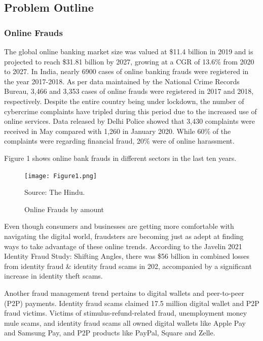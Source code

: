 \documentclass[12pt, oneside, a4paper]{article}
\begin{document}
\pagebreak
\subsection{Problem Outline}
\vspace{0.5cm}
\subsubsection{Online Frauds}
The global online banking market size was valued at \$11.4 billion in 2019 and is projected to reach \$31.81 billion by 2027, growing at a CGR of 13.6\% from 2020 to 2027. In India, nearly 6900 cases of online banking frauds were registered in the year 2017-2018. As per data maintained by the National Crime Records Bureau, 3,466 and 3,353 cases of online frauds were registered in 2017 and 2018, respectively. Despite the entire country being under lockdown, the number of cybercrime complaints have tripled during this period due to the increased use of online services. Data released by Delhi Police showed that 3,430 complaints were received in May compared with 1,260 in January 2020. While 60\% of the complaints were regarding financial fraud, 20\% were of online harassment.

Figure 1 shows online bank frauds in different sectors in the last ten years.

\begin{figure}[H]
\begin{center}
\texttt{[image: Figure1.png]}\\
\caption{Online Frauds by amount}{Source: The Hindu.}
\label{fig:Figure 1}
\end{center}
\end{figure}

Even though consumers and businesses are getting more comfortable with navigating the digital world, fraudsters are becoming just as adept at finding ways to take advantage of these online trends. According to the Javelin 2021 Identity Fraud Study: Shifting Angles, there was \$56 billion in combined losses from identity fraud & identity fraud scams in 202, accompanied by a significant increase in identity theft scams.

Another fraud management trend pertains to digital wallets and peer-to-peer (P2P) payments. Identity fraud scams claimed 17.5 million digital wallet and P2P fraud victims. Victims of stimulus-refund-related fraud, unemployment money mule scams, and identity fraud scams all owned digital wallets like Apple Pay and Samsung Pay, and P2P products like PayPal, Square and Zelle. 
\end{document}
